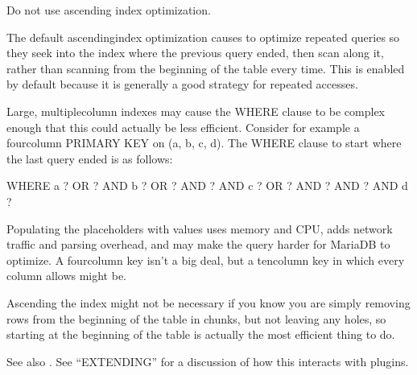 \documentclass[letterpaper,10pt,english]{sphinxmanual}
\begin{document}
\begin{fulllineitems}
\label{\detokenize{mariadb-archiver:cmdoption-mariadb-archiver-no-ascend}}
\sphinxAtStartPar
Do not use ascending index optimization.

\sphinxAtStartPar
The default ascending\sphinxhyphen{}index optimization causes  to optimize
repeated  queries so they seek into the index where the previous query
ended, then scan along it, rather than scanning from the beginning of the table
every time.  This is enabled by default because it is generally a good strategy
for repeated accesses.

\sphinxAtStartPar
Large, multiple\sphinxhyphen{}column indexes may cause the WHERE clause to be complex enough
that this could actually be less efficient.  Consider for example a four\sphinxhyphen{}column
PRIMARY KEY on (a, b, c, d).  The WHERE clause to start where the last query
ended is as follows:

\begin{sphinxVerbatim}[commandchars=\\\{\}]
WHERE a \PYGZgt{} ?
   OR   ? AND b \PYGZgt{} ?
   OR   ? AND   ? AND c \PYGZgt{} ?
   OR   ? AND   ? AND   ? AND d \PYGZgt{} ?
\end{sphinxVerbatim}

\sphinxAtStartPar
Populating the placeholders with values uses memory and CPU, adds network
traffic and parsing overhead, and may make the query harder for MariaDB to
optimize.  A four\sphinxhyphen{}column key isn’t a big deal, but a ten\sphinxhyphen{}column key in which
every column allows  might be.

\sphinxAtStartPar
Ascending the index might not be necessary if you know you are simply removing
rows from the beginning of the table in chunks, but not leaving any holes, so
starting at the beginning of the table is actually the most efficient thing to
do.

\sphinxAtStartPar
See also {\hyperref[\detokenize{mariadb-archiver:cmdoption-mariadb-archiver-ascend-first}]{}}.  See “EXTENDING” for a discussion of how this
interacts with plugins.

\end{fulllineitems}
\end{document}
